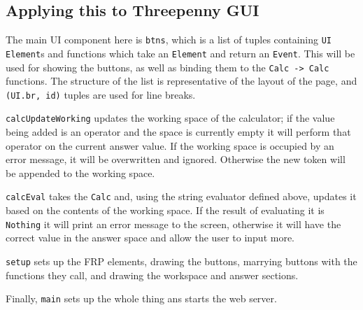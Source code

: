 \documentclass[12pt]{article}
\begin{document}
\subsection{Applying this to Threepenny GUI}



The main UI component here is \verb|btns|, which is a list of tuples containing \verb|UI Element|s and functions which take an \verb|Element| and return an \verb|Event|.
This will be used for showing the buttons, as well as binding them to the \verb|Calc -> Calc| functions.
The structure of the list is representative of the layout of the page, and \verb|(UI.br, id)| tuples are used for line breaks.



\verb|calcUpdateWorking| updates the working space of the calculator; if the value being added is an operator and the space is currently empty it will perform that operator on the current answer value.
If the working space is occupied by an error message, it will be overwritten and ignored.
Otherwise the new token will be appended to the working space.



\verb|calcEval| takes the \verb|Calc| and, using the string evaluator defined above, updates it based on the contents of the working space.
If the result of evaluating it is \verb|Nothing| it will print an error message to the screen, otherwise it will have the correct value in the answer space and allow the user to input more.



\verb|setup| sets up the FRP elements, drawing the buttons, marrying buttons with the functions they call, and drawing the workspace and answer sections.



Finally, \verb|main| sets up the whole thing ans starts the web server.
\end{document}
